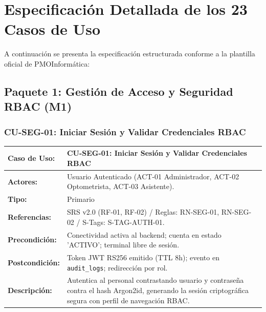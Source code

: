 \documentclass[12pt,a4paper]{report}
\begin{document}
\chapter{Especificación Detallada de los 23 Casos de Uso}

A continuación se presenta la especificación estructurada conforme a la plantilla oficial de PMOInformática:

\section{Paquete 1: Gestión de Acceso y Seguridad RBAC (M1)}

\subsection{CU-SEG-01: Iniciar Sesión y Validar Credenciales RBAC}
\begin{table}[H]
\centering
\small
\begin{tabularx}{\textwidth}{|L{3.5cm}|X|}
\hline
{}\color{white}\textbf{Caso de Uso:} & \textbf{CU-SEG-01: Iniciar Sesión y Validar Credenciales RBAC} \\
\hline
\textbf{Actores:} & Usuario Autenticado (ACT-01 Administrador, ACT-02 Optometrista, ACT-03 Asistente). \\
\hline
\textbf{Tipo:} & Primario \\
\hline
\textbf{Referencias:} & SRS v2.0 (RF-01, RF-02) / Reglas: RN-SEG-01, RN-SEG-02 / S-Tags: S-TAG-AUTH-01. \\
\hline
\textbf{Precondición:} & Conectividad activa al backend; cuenta en estado 'ACTIVO'; terminal libre de sesión. \\
\hline
\textbf{Postcondición:} & Token JWT RS256 emitido (TTL 8h); evento en \texttt{audit\_logs}; redirección por rol. \\
\hline
\textbf{Descripción:} & Autentica al personal contrastando usuario y contraseña contra el hash Argon2id, generando la sesión criptográfica segura con perfil de navegación RBAC. \\
\hline
\end{tabularx}
\end{table}
\end{document}
